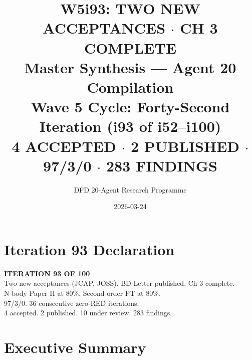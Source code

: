 \documentclass[11pt,a4paper]{article}
\title{\Huge W5i93: TWO NEW ACCEPTANCES $\cdot$ CH 3 COMPLETE\\[12pt]
\Large Master Synthesis --- Agent 20 Compilation\\[6pt]
\large Wave 5 Cycle: Forty-Second Iteration (i93 of i52--i100)\\[6pt]
\normalsize \textbf{4 ACCEPTED} $\cdot$ \textbf{2 PUBLISHED} $\cdot$ 97/3/0 $\cdot$ 283 FINDINGS}
\author{DFD 20-Agent Research Programme}
\date{2026-03-24}
\begin{document}
\maketitle

\section*{Iteration 93 Declaration}

\begin{tcolorbox}[colback=green!5!white, colframe=dfdgreen]
\begin{center}
\Large\textbf{ITERATION 93 OF 100}\\[6pt]
\large Two new acceptances (JCAP, JOSS). BD Letter published. Ch 3 complete.\\
N-body Paper II at 80\%. Second-order PT at 80\%.\\[6pt]
\normalsize 97/3/0. 36 consecutive zero-RED iterations.\\
4 accepted. 2 published. 10 under review. 283 findings.
\end{center}
\end{tcolorbox}

\section{Executive Summary}
\end{document}
